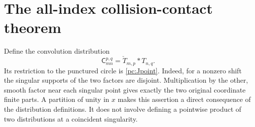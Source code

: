 \documentclass[11pt,a4paper]{article}
\numberwithin{equation}{section}
\theoremstyle{definition}
\newcommand{\Cf}{\mathsf C}
\begin{document}
\section{The all-index collision-contact theorem}\label{pc:mainsection}
Define the convolution distribution
\begin{equation}\label{pc:Cdef}
 \Cf_{mn}^{p,q}=\check T_{m,p}*T_{n,q}.
\end{equation}
Its restriction to the punctured circle is \eqref{pc:Jpoint}. Indeed, for a nonzero shift the singular supports of the two factors are disjoint. Multiplication by the other, smooth factor near each singular point gives exactly the two original coordinate finite parts. A partition of unity in $x$ makes this assertion a direct consequence of the distribution definitions. It does not involve defining a pointwise product of two distributions at a coincident singularity.
\end{document}
